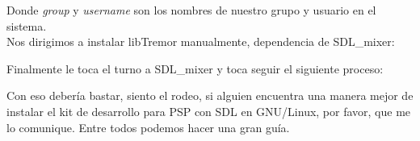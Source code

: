 

Donde \emph{group} y \emph{username} son los nombres de nuestro grupo y 
usuario en el sistema.\\

Nos dirigimos a instalar libTremor manualmente, dependencia de SDL\_mixer:



Finalmente le toca el turno a SDL\_mixer y toca seguir el siguiente proceso:



Con eso debería bastar, siento el rodeo, si alguien encuentra una manera
mejor de instalar el kit de desarrollo para PSP con SDL en GNU/Linux, por
favor, que me lo comunique. Entre todos podemos hacer una gran guía.
